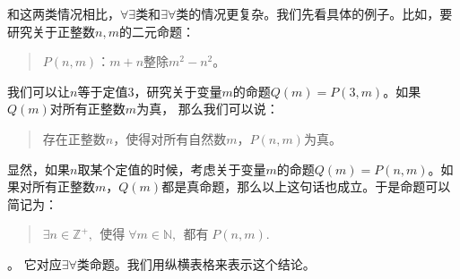 \documentclass[12pt,UTF8,fontset=none]{ctexbook}
\begin{document}
和这两类情况相比，$\forall\exists$类和$\exists\forall$类的情况更复杂。我们先看具体的例子。比如，要研究关于正整数$n,m$的二元命题：
\begin{quotation}
    $P(n,m)$：$m + n$整除$m^2 - n^2$。
\end{quotation}
我们可以让$n$等于定值$3$，研究关于变量$m$的命题$Q(m) = P(3,m)$。如果$Q(m)$对所有正整数$m$为真，
那么我们可以说：
\begin{quotation}
    存在正整数$n$，使得对所有自然数$m$，$P(n,m)$为真。
\end{quotation}
显然，如果$n$取某个定值的时候，考虑关于变量$m$的命题$Q (m) = P(n,m)$。如果对所有正整数$m$，$Q(m)$都是真命题，那么以上这句话也成立。于是命题可以简记为：
\begin{quotation}
    $\exists n\in\mathbb{Z}^+, \;\, \mbox{使得}\;\forall m\in\mathbb{N}, \;\,\mbox{都有} \;P(n,m).$
\end{quotation}。
它对应$\exists\forall$类命题。我们用纵横表格来表示这个结论。
\end{document}
